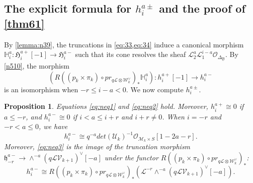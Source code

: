 \documentclass{amsart}
\numberwithin{equation}{section}
\newcommand\mc{\mathcal}
\newcommand\mf{\mathfrak}
\newcommand\mb{\mathbb}
\newtheorem{proposition}[theorem]{Proposition}
\theoremstyle{definition}
\theoremstyle{remark}
\begin{document}
\subsection{The explicit formula for $h_{i}^{a\pm}$ and the proof of \cref{thm61}}
\label{sec4} By \cref{lemma:n39}, the truncations in \cref{eq:33,eq:34} induce a canonical morphism $\mb{H}_{i}^{a}:\mf{H}_{i}^{a+}[-1]\to \mf{H}_{i}^{a-}$
such that its cone resolves the sheaf $\mc{L}_{2}^{a}\mc{L}^{i-a}_{1}\mc{O}_{\Delta_{\mf{Y}}}$. By \cref{n510}, the morphism
\begin{equation}
  \label{n55}
  (R((p_{k}\times \pi_{k})\circ pr_{q\mc{L}\otimes \mc{W}_{k}^{\vee}})_{*}\mb{H}_{i}^{a}):h_{i}^{a+}[-1]\to h_{i}^{a-}  
\end{equation}
is an isomorphism when $-r\leq i-a<0$. We now compute $h_{i}^{a\pm}$.
\begin{proposition}
  \label{lcor} \label{n54} \label{n56} Equations \cref{eq:neq1} and \cref{eq:neq2} hold. Moreover, $h_{i}^{a+}\cong0$ if $a\leq -r$, and $h_{i}^{a-}\cong0$ if $i<a\leq i+r$ and $i+r\neq 0$. When $i=-r$ and $-r<a\leq 0$, we have
  \begin{equation}
    \label{eq:neq3}
   h_{i}^{a-}\cong q^{-a}det(\mc{U}_{k})^{-1}\mc{O}_{\mc{M}_{k}\times S}[1-2a-r].
 \end{equation}
 Moreover, \cref{eq:neq3} is the image of the truncation morphism $\mf{h}_{-r}^{a-}\to \wedge^{-a}(q\mc{L}\mc{V}_{k+1})^{\vee}[-a]$ under the functor $R((p_{k}\times \pi_{k})\circ pr_{q\mc{L}\otimes \mc{W}_{k}^{\vee}})_{*}$:
 \begin{equation}
   \label{eq:4115}
    h_{i}^{a-}\cong R((p_{k}\times \pi_{k})\circ pr_{q\mc{L}\otimes \mc{W}_{k}^{\vee}})_{*}(\mc{L}^{-r}\wedge^{-a}(q\mc{L}\mc{V}_{k+1})^{\vee}[-a]).
 \end{equation}
\end{proposition}
\end{document}
